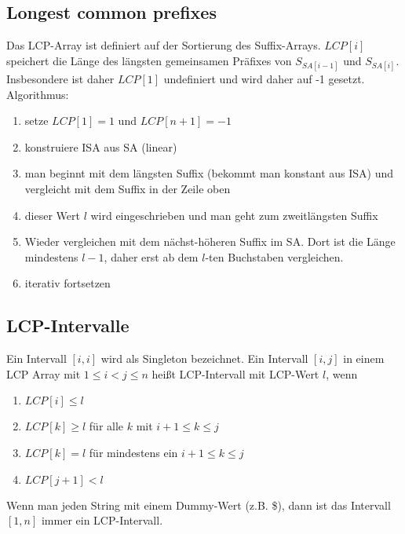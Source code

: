 \documentclass[a4paper, 12pt]{article}
\theoremstyle{plain}
\theoremstyle{definition}
\theoremstyle{lemma}
\theoremstyle{remark}
\theoremstyle{corollary}
\theoremstyle{example}
\begin{document}
	\subsection{Longest common prefixes}
	Das LCP-Array ist definiert auf der Sortierung des Suffix-Arrays. $LCP[i]$ speichert die Länge des längsten gemeinsamen Präfixes von $S_{SA[i-1]}$ und $S_{SA[i]}$. Insbesondere ist daher $LCP[1]$ undefiniert und wird daher auf -1 gesetzt. Algorithmus: \begin{enumerate}
		\item setze $LCP[1] = 1$ und $LCP[n+1] = -1$
		\item konstruiere ISA aus SA (linear)
		\item man beginnt mit dem längsten Suffix (bekommt man konstant aus ISA) und vergleicht mit dem Suffix in der Zeile oben
		\item dieser Wert $l$ wird eingeschrieben und man geht zum zweitlängsten Suffix
		\item Wieder vergleichen mit dem nächst-höheren Suffix im SA. Dort ist die Länge mindestens $l-1$, daher erst ab dem $l$-ten Buchstaben vergleichen.
		\item iterativ fortsetzen
	\end{enumerate}
	\subsection{LCP-Intervalle}
	Ein Intervall $[i,i]$ wird als Singleton bezeichnet. Ein Intervall $[i,j]$ in einem LCP Array mit $1 \leq i < j \leq n$ heißt LCP-Intervall mit LCP-Wert $l$, wenn \begin{enumerate}
		\item $LCP[i] \leq l$
		\item $LCP[k]\geq l$ für alle $k$ mit $i+1 \leq k \leq j$
		\item $LCP[k] = l$ für mindestens ein $i+1 \leq k \leq j$
		\item $LCP[j+1] < l$
	\end{enumerate}
	Wenn man jeden String mit einem Dummy-Wert (z.B. \$), dann ist das Intervall $[1,n]$ immer ein LCP-Intervall.
\end{document}

